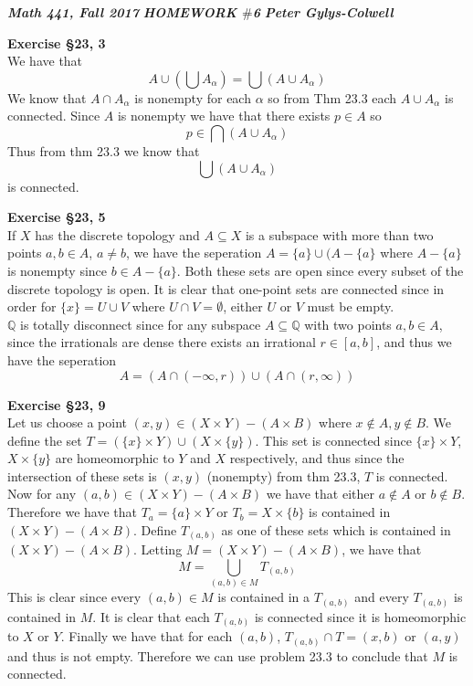 \documentclass[12pt]{article}
\newenvironment{ques}[1]{\textbf{Exercise #1}\vspace{1 mm}\\ }{\bigskip}
\theoremstyle{definition}
\renewcommand{\l}{\left }
\renewcommand{\r}{\right }
\newcommand{\Q}{\mathbb Q}
\renewcommand{\a}{\alpha}
\begin{document}
\noindent \textit{\textbf{Math 441, Fall 2017}} \hspace{1.3cm}
\textit{\textbf{HOMEWORK $\#$6}} \hspace{1.3cm} \textit{\textbf{Peter
Gylys-Colwell}} 

\vspace{1cm}

\begin{ques}{\S 23, 3}
	We have that 
	$$A \cup \l(\bigcup A_\a \r) = \bigcup \l( A \cup A_\a \r)$$
	We know that $A \cap A_\a$ is nonempty for each $\a$ so from Thm 23.3 each
	$A \cup A_\a$ is connected. Since $A$ is nonempty we have that there
	exists $p \in A$ so
	$$p \in \bigcap \l( A \cup A_\a \r)$$
	Thus from thm 23.3 we know that 
	$$\bigcup \l( A \cup A_\a \r)$$
	is connected.
\end{ques}

\begin{ques}{\S 23, 5}
	If $X$ has the discrete topology and $A \subseteq X$ is a subspace with
	more than two points $a, b \in A$, $a \neq b$, we have the seperation $A =
	\{a\} \cup (A - \{a\}$ where $A - \{a\}$ is nonempty since $b \in A -
	\{a\}$. Both these sets are open since every subset of the discrete
	topology is open. It is clear that one-point sets are connected since in
	order for $\{x\} = U \cup V$ where $U \cap V = \emptyset$, either $U$ or
	$V$ must be empty.\\
	$\Q$ is totally disconnect since for any subspace $A \subseteq \Q$ with two
	points $a,b \in A$, since the irrationals are dense there exists an
	irrational $r \in [a,b]$, and thus we have the seperation 
	$$A = \l(A \cap (-\infty, r)\r) \cup \l(A \cap (r, \infty)\r)$$
\end{ques}

\begin{ques}{\S 23, 9}
	Let us choose a point $(x,y) \in (X \times Y) - (A \times B)$ where $x
	\notin A, y \notin B$. We define the set $T = (\{x\} \times Y) \cup (X
	\times \{y\})$. This set is connected since $\{x\} \times Y$, $X \times
	\{y\}$ are homeomorphic to $Y$ and $X$ respectively, and thus since the
	intersection of these sets is $(x,y)$ (nonempty) from thm 23.3, $T$ is
	connected. \\ Now for any $(a,b) \in (X \times Y) - (A \times B)$ we have
	that either $a \notin A$ or $b \notin B$. Therefore we have that $T_a = \{a\}
	\times Y$ or $T_b = X \times \{b\}$ is contained in $(X \times Y) - (A \times
	B)$. Define $T_{(a,b)}$ as one of these sets which is contained in $(X \times
	Y) - (A \times B)$. Letting $M = (X \times Y) - (A \times B)$, we have that
	$$M = \bigcup_{(a,b) \in M} T_{(a,b)}$$
	This is clear since every $(a,b) \in M$ is contained in a $T_{(a,b)}$ and
	every $T_{(a,b)}$ is contained in $M$. It is clear that each $T_{(a,b)}$ is
	connected since it is homeomorphic to $X$ or $Y$. Finally we have that for
	each $(a,b)$, $T_{(a,b)} \cap T = (x,b)$ or $(a,y)$ and thus is not empty.
	Therefore we can use problem 23.3 to conclude that $M$ is connected.
\end{ques}
\end{document}
